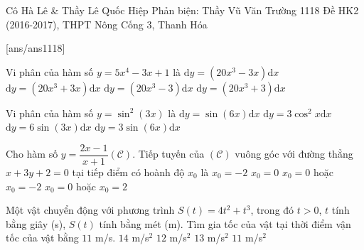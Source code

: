 \begin{name}
	{Cô Hà Lê \& Thầy Lê Quốc Hiệp
		\newline Phản biện: Thầy Vũ Văn Trường}
	{1118 Đề HK2 (2016-2017), THPT Nông Cống 3, Thanh Hóa}%
\end{name}
\setcounter{ex}{0}\setcounter{bt}{0}
[ans/ans1118]
\begin{ex}%
	Vi phân của hàm số $y=5x^4-3x+1$ là
	\choice
	{$\mathrm{d}y=(20x^3 -3x) \mathrm{d}x$}
	{$\mathrm{d}y=(20x^3 +3x) \mathrm{d}x$}
	{\True $\mathrm{d}y=(20x^3 -3) \mathrm{d}x$}
	{$\mathrm{d}y=(20x^3 +3) \mathrm{d}x$}
\end{ex}


\begin{ex}%
	Vi phân của hàm số $y=\sin^2{(3x)}$ là
	\choice
	{$\mathrm{d}y=\sin{(6x)}\mathrm{d}x$}
	{$\mathrm{d}y=3 \cos^2{x}\mathrm{d}x$}
	{$\mathrm{d}y=6\sin{(3x)}\mathrm{d}x$}
	{\True $\mathrm{d}y=3\sin{(6x)}\mathrm{d}x$}
\end{ex}


\begin{ex}%
	Cho hàm số $y=\dfrac{2x-1}{x+1} (\mathcal{C})$. Tiếp tuyến của $(\mathcal{C})$ vuông góc với đường thẳng $x+3y+2=0$ tại tiếp điểm có hoành độ $x_0$ là
	\choice
	{$x_0=-2$}
	{ $x_0=0$}
	{\True $x_0=0$ hoặc $x_0=-2$}
	{$x_0=0$ hoặc $x_0=2$}
\end{ex}


\begin{ex}%
	Một vật chuyển động với phương trình $S(t)=4t^2+t^3$, trong đó $t>0$, $t$ tính bằng giây (s), $S(t)$ tính bằng mét (m). Tìm gia tốc của vật tại thời điểm vận tốc của vật bằng $11$ m/s.
	\choice
	{\True $14$ m/s$^2$}
	{$12$ m/s$^2$}
	{$13$ m/s$^2$}
	{$11$ m/s$^2$}
\end{ex}


